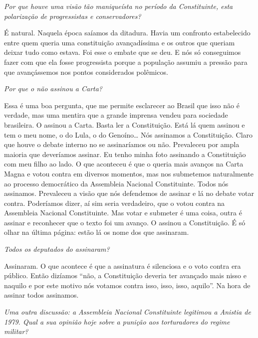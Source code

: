 \medskip

\noindent\emph{Por que houve uma visão tão maniqueísta no período da
Constituinte, esta polarização de progressistas e conservadores?}

É natural. Naquela época saíamos da ditadura. Havia um
confronto estabelecido entre quem queria uma constituição avançadíssima
e os outros que queriam deixar tudo como estava. Foi esse o embate que
se deu. E nós só conseguimos fazer com que ela fosse progressista porque
a população assumiu a pressão para que avançássemos nos pontos
considerados polêmicos.

\medskip

\noindent\emph{Por que o  não assinou a Carta?}

Essa é uma boa pergunta, que me permite esclarecer ao
Brasil que isso não é verdade, mas uma mentira que a grande imprensa
vendeu para sociedade brasileira. O  assinou a Carta. Basta ler a
Constituição. Está lá quem assinou e tem o meu nome, o do Lula, o do
Genoíno\ldots{} Nós assinamos a Constituição. Claro que houve o debate
interno no  se assinaríamos ou não. Prevaleceu por ampla maioria que
deveríamos assinar. Eu tenho minha foto assinando a Constituição com meu
filho ao lado. O que aconteceu é que o  queria mais avanços na Carta
Magna e votou contra em diversos momentos, mas nos submetemos
naturalmente ao processo democrático da Assembleia Nacional
Constituinte. Todos nós assinamos. Prevaleceu a visão que nós defendemos
de assinar e lá no debate votar contra. Poderíamos dizer, aí sim seria
verdadeiro, que o  votou contra na Assembleia Nacional Constituinte.
Mas votar e submeter é uma coisa, outra é assinar e reconhecer que o
texto foi um avanço. O  assinou a Constituição. É só olhar na última
página: estão lá os nome dos que assinaram.

\medskip

\noindent\emph{Todos os deputados do  assinaram?}

Assinaram. O que acontece é que a assinatura é silenciosa
e o voto contra era público. Então dizíamos ``não, a Constituição
deveria ter avançado mais nisso e naquilo e por este motivo nós votamos
contra isso, isso, isso, aquilo''. Na hora de assinar todos assinamos.

\medskip

\noindent\emph{Uma outra discussão: a Assembleia Nacional Constituinte
legitimou a Anistia de 1979. Qual a sua opinião hoje sobre a punição aos
torturadores do regime militar?}

